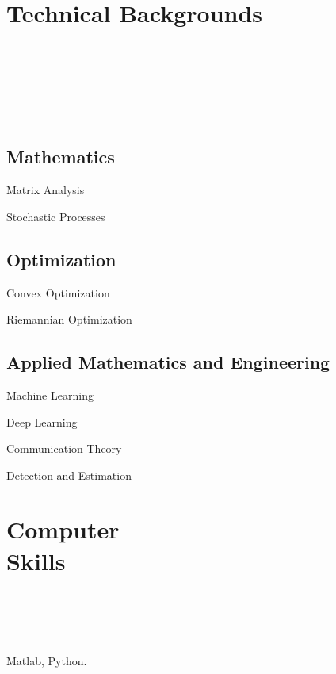 \documentclass{article}
\begin{document}
\section*{\colorbox{mygrey}{Technical Backgrounds ~~~~~~~~~~~~~~~~~~~~~~~~~~~~~~~~~~~~~~~~~~~~~~~~~~~~~~~~~~~~~~~~~~~~~~~~}}
\subsection*{Mathematics}
\begin{minipage}{0.28\linewidth}
 Matrix Analysis
\end{minipage} 
\begin{minipage}{0.4\linewidth}
Stochastic Processes
\end{minipage} 
\begin{minipage}{0.32\linewidth}
 
\end{minipage} 

\subsection*{Optimization} 
\begin{minipage}{0.28\linewidth}
Convex Optimization
\end{minipage}
\begin{minipage}{0.4\linewidth}
Riemannian Optimization
\end{minipage}
\begin{minipage}{0.32\linewidth}

\end{minipage}

\subsection*{Applied Mathematics and Engineering}
\begin{minipage}{0.28\linewidth}
Machine Learning
\end{minipage}
\begin{minipage}{0.20\linewidth}
Deep Learning
\end{minipage}
\begin{minipage}{0.25\linewidth}
Communication Theory
\end{minipage}
\begin{minipage}{0.25\linewidth}
Detection and Estimation
\end{minipage}



\section*{\colorbox{mygrey}{Computer Skills~~~~~~~~~~~~~~~~~~~~~~~~~~~~~~~~~~~~~~~~~~~~~~~~~~~~~~~~~~~~~~~~~~~~~~~~~~~~~~~~~~}}

Matlab,  Python.


\end{document}
